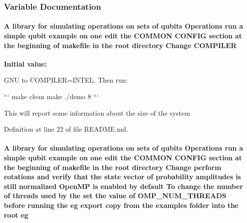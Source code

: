 \subsubsection{Variable Documentation}
\hypertarget{README_8md_a91ed524b92d43287f611912bb99ccb2a}{
\paragraph[{COMPILER}]{\setlength{\rightskip}{0pt plus 5cm}A library for simulating operations on sets of qubits Operations run a simple qubit example on one edit the COMMON CONFIG section at the beginning of makefile in the root directory Change {\bf COMPILER}}\hfill}
\label{README_8md_a91ed524b92d43287f611912bb99ccb2a}
{\bfseries Initial value:}
\begin{DoxyCode}
GNU to COMPILER=INTEL. Then run:

```
make clean
make
./demo 8
```

This will report some information about the size of the system
\end{DoxyCode}


Definition at line 22 of file README.md.\hypertarget{README_8md_a60a90a09308ad7ec0ea2ac389281518b}{
\paragraph[{eg}]{\setlength{\rightskip}{0pt plus 5cm}A library for simulating operations on sets of qubits Operations run a simple qubit example on one edit the COMMON CONFIG section at the beginning of makefile in the root directory Change perform {\bf rotations} and verify that the state vector of probability amplitudes {\bf is} still normalized OpenMP {\bf is} enabled by default To change the number of threads used by the set the value of {\bf OMP\_\-NUM\_\-THREADS} before running the {\bf eg} export copy from the examples {\bf folder} into the root {\bf eg}}\hfill}
\label{README_8md_a60a90a09308ad7ec0ea2ac389281518b}


